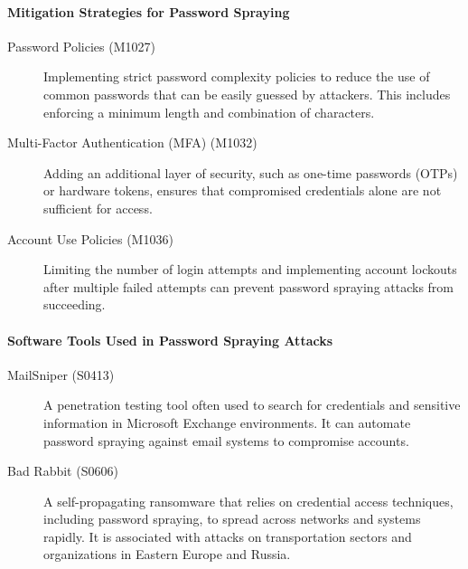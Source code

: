 \documentclass[12pt,a4paper]{report}
\begin{document}
\paragraph{Mitigation Strategies for Password Spraying}
\begin{description}
	\item[Password Policies (M1027)] Implementing strict password complexity policies to reduce the use of common passwords that can be easily guessed by attackers. This includes enforcing a minimum length and combination of characters.
	
	\item[Multi-Factor Authentication (MFA) (M1032)] Adding an additional layer of security, such as one-time passwords (OTPs) or hardware tokens, ensures that compromised credentials alone are not sufficient for access.
	
	\item[Account Use Policies (M1036)] Limiting the number of login attempts and implementing account lockouts after multiple failed attempts can prevent password spraying attacks from succeeding.
\end{description}

\paragraph{Software Tools Used in Password Spraying Attacks}
\begin{description}
	\item[MailSniper (S0413)] A penetration testing tool often used to search for credentials and sensitive information in Microsoft Exchange environments. It can automate password spraying against email systems to compromise accounts.
	
	\item[Bad Rabbit (S0606)] A self-propagating ransomware that relies on credential access techniques, including password spraying, to spread across networks and systems rapidly. It is associated with attacks on transportation sectors and organizations in Eastern Europe and Russia.
\end{description}
\end{document}

